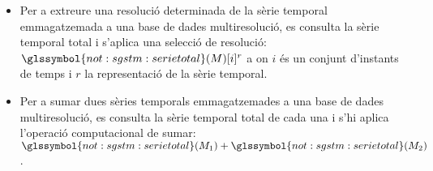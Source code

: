 \begin{itemize}
\item Per a extreure una resolució determinada de la sèrie temporal
  emmagatzemada a una base de dades multiresolució, es consulta la
  sèrie temporal total i s'aplica una selecció de resolució:
  $\glssymbol{not:sgstm:serietotal}(M)[i]^r$ a on $i$ és un conjunt
  d'instants de temps i $r$ la representació de la sèrie temporal.

\item Per a sumar dues sèries temporals emmagatzemades a una base de
  dades multiresolució, es consulta la sèrie temporal total de cada
  una i s'hi aplica l'operació computacional de sumar:
  $\glssymbol{not:sgstm:serietotal}(M_1)+\glssymbol{not:sgstm:serietotal}(M_2)$.

\end{itemize}



